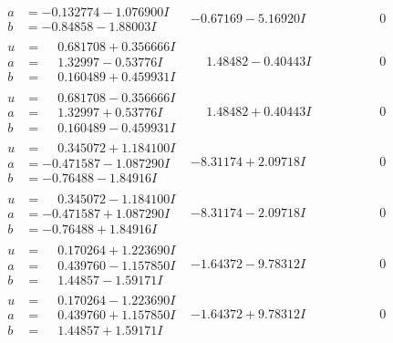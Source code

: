 \documentclass[1p]{elsarticle_modified}
\theoremstyle{definition}
\begin{document}
$$\begin{array}{c|c|c}
\begin{aligned}
a &= -0.132774 - 1.076900 I \\
b &= -0.84858 - 1.88003 I\end{aligned}
 & -0.67169 - 5.16920 I & \phantom{-0.000000 } 0 \\ \hline\begin{aligned}
u &= \phantom{-}0.681708 + 0.356666 I \\
a &= \phantom{-}1.32997 - 0.53776 I \\
b &= \phantom{-}0.160489 + 0.459931 I\end{aligned}
 & \phantom{-}1.48482 - 0.40443 I & \phantom{-0.000000 } 0 \\ \hline\begin{aligned}
u &= \phantom{-}0.681708 - 0.356666 I \\
a &= \phantom{-}1.32997 + 0.53776 I \\
b &= \phantom{-}0.160489 - 0.459931 I\end{aligned}
 & \phantom{-}1.48482 + 0.40443 I & \phantom{-0.000000 } 0 \\ \hline\begin{aligned}
u &= \phantom{-}0.345072 + 1.184100 I \\
a &= -0.471587 - 1.087290 I \\
b &= -0.76488 - 1.84916 I\end{aligned}
 & -8.31174 + 2.09718 I & \phantom{-0.000000 } 0 \\ \hline\begin{aligned}
u &= \phantom{-}0.345072 - 1.184100 I \\
a &= -0.471587 + 1.087290 I \\
b &= -0.76488 + 1.84916 I\end{aligned}
 & -8.31174 - 2.09718 I & \phantom{-0.000000 } 0 \\ \hline\begin{aligned}
u &= \phantom{-}0.170264 + 1.223690 I \\
a &= \phantom{-}0.439760 - 1.157850 I \\
b &= \phantom{-}1.44857 - 1.59171 I\end{aligned}
 & -1.64372 - 9.78312 I & \phantom{-0.000000 } 0 \\ \hline\begin{aligned}
u &= \phantom{-}0.170264 - 1.223690 I \\
a &= \phantom{-}0.439760 + 1.157850 I \\
b &= \phantom{-}1.44857 + 1.59171 I\end{aligned}
 & -1.64372 + 9.78312 I & \phantom{-0.000000 } 0 \\ \hline\begin{aligned}

\end{aligned}
\end{array}$$
\end{document}
